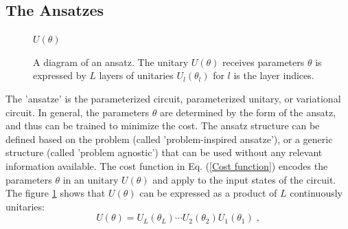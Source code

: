 \subsection{The Ansatzes}
\begin{figure} 
    \centerline{$U(\theta)$}
    \caption{
        A diagram of an ansatz.
        The unitary $U(\theta)$ receives parameters $\theta$ is expressed by $L$ layers of unitaries $U_l(\theta_l)$ for $l$ is the layer indices.
    }\label{Ansatz diagram}
\end{figure}

The 'ansatze' is the parameterized circuit, parameterized unitary, or variational circuit.
In general, the parameters $\theta$ are determined by the form of the ansatz, and thus can be trained to minimize the cost.
The ansatz structure can be defined based on the problem (called 'problem-inspired ansatze'), or a generic structure (called 'problem agnostic') that can be used without any relevant information available.
The cost function in Eq. (\ref{Cost function}) encodes the parameters $\theta$ in an unitary $U(\theta)$ and apply to the input states of the circuit. The figure \ref{Ansatz diagram} shows that $U(\theta)$ can be expressed as a product of $L$ continuously unitaries:
\begin{equation}
    U(\theta) = U_L(\theta_L) \cdots U_2(\theta_2) U_1(\theta_1)\;,
\end{equation}


